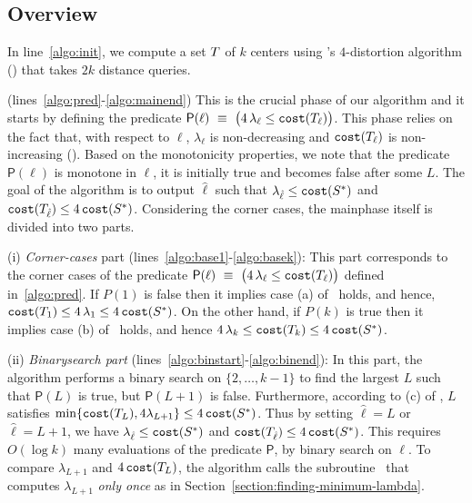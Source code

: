 \subsection{Overview}

 In line~\ref{algo:init}, we compute a set $T$ of $k$ centers using \citet{burkhardt2024low}'s $4$-distortion algorithm () that takes $2k$ distance queries.

 (lines~\ref{algo:pred}-\ref{algo:mainend})
This is the crucial phase of our algorithm and it starts by defining the predicate $\mathsf{P}(\ell) ~\equiv~ \bigl( 4\,\lambda_{\ell} \leq \texttt{cost}(T_{\ell}) \bigr)$. 
This phase relies on the fact that, with respect to $\ell$, $\lambda_{\ell}$ is non-decreasing and $\texttt{cost}(T_{\ell})$ is non-increasing (). 
    Based on the monotonicity properties, we note that the predicate $\mathsf{P}(\ell)$ is monotone in $\ell$, it is initially true and becomes false after some $L$.
    The goal of the algorithm is to output $\hat{\ell}$ such that $\lambda_{\hat{\ell}} \leq \texttt{cost}(S^*)$ and $\texttt{cost}(T_{\hat{\ell}}) \leq 4\, \texttt{cost}(S^*)$.
    Considering the corner cases, the mainphase itself is divided into two parts.

\noindent (i) \textit{Corner-cases} part (lines~\ref{algo:base1}-\ref{algo:basek}):
This part corresponds to the corner cases of the predicate  $\mathsf{P}(\ell) ~\equiv~ \bigl( 4\,\lambda_{\ell} \leq \texttt{cost}(T_{\ell}) \bigr)$ defined in~\cref{algo:pred}. 
If $P(1)$ is false then it implies case (a) of~ holds, and hence, $\texttt{cost}(T_{1}) \leq 4\,\lambda_{1} \leq 4\,\texttt{cost}(S^*)$. 
On the other hand, if $P(k)$ is true then it implies case (b) of~ holds, and hence $4\,\lambda_{k} \leq \texttt{cost}(T_{k}) \leq 4\,\texttt{cost}(S^*)$.  

\noindent(ii) \textit{Binarysearch part} (lines~\ref{algo:binstart}-\ref{algo:binend}): In this part, the algorithm performs a binary search on $\{2,\dots, k-1\}$ to find the largest $L$ such that $\mathsf{P}({L})$ is true, but $\mathsf{P}({L}+1)$ is false. 
Furthermore, according to (c) of , $L$ satisfies $\min \{\texttt{cost}(T_{L}), 4 \lambda_{L+1}\} \leq 4\,\texttt{cost}(S^*)$. 
Thus by setting $\hat{\ell} = L$ or $\hat{\ell} = L+1$, we have $\lambda_{\hat{\ell}} \leq \texttt{cost}(S^*)$ and $\texttt{cost}(T_{\hat{\ell}}) \leq 4\, \texttt{cost}(S^*)$. 
This requires $O(\log k)$ many evaluations of the predicate $\mathsf{P}$, by binary search on $\ell$. 
To compare $\lambda_{L+1}$ and $4\,\texttt{cost}(T_{L})$, the algorithm calls the subroutine \findlambda\ that computes $\lambda_{L+1}$ \emph{only once} as in Section~\ref{section:finding-minimum-lambda}.



